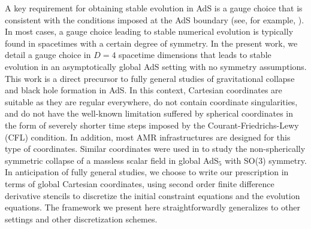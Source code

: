 \documentclass[aps,letterpaper,twocolumn,nofootinbib]{revtex4}
\numberwithin{equation}{section}
\begin{document}
A key requirement for obtaining stable evolution in AdS is a gauge choice that is consistent with the conditions imposed at the AdS boundary (see, for example, \cite{Bantilan:2012vu}).
In most cases, a gauge choice leading to stable numerical evolution is typically found in spacetimes with a certain degree of symmetry.
In the present work, we detail a gauge choice in $D=4$ spacetime dimensions that leads to stable evolution in an asymptotically global AdS setting with no symmetry assumptions.
This work is a direct precursor to fully general studies of gravitational collapse and black hole formation in AdS.
In this context, Cartesian coordinates are suitable as they are regular everywhere, do not contain coordinate singularities, and do not have the well-known limitation suffered by spherical coordinates in the form of severely shorter time steps imposed by the Courant-Friedrichs-Lewy (CFL) condition. In addition, most AMR infrastructures are designed for this type of coordinates. 
Similar coordinates were used in \cite{Bantilan:2017kok} to study the non-spherically symmetric collapse of a massless scalar field in global AdS$_5$ with SO(3) symmetry. 
In anticipation of fully general studies, we choose to write our prescription in terms of global Cartesian coordinates, using second order finite difference derivative stencils to discretize the initial constraint equations and the evolution equations. 
The framework we present here straightforwardly generalizes to other settings and other discretization schemes.
\end{document}
